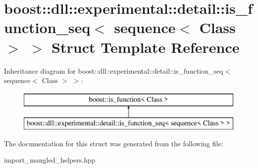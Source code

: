 \hypertarget{a01456}{}\section{boost\+:\+:dll\+:\+:experimental\+:\+:detail\+:\+:is\+\_\+function\+\_\+seq$<$ sequence$<$ Class $>$ $>$ Struct Template Reference}
\label{a01456}
Inheritance diagram for boost\+:\+:dll\+:\+:experimental\+:\+:detail\+:\+:is\+\_\+function\+\_\+seq$<$ sequence$<$ Class $>$ $>$\+:\begin{figure}[H]
\begin{center}
\leavevmode
\includegraphics[height=2.000000cm]{a01456}
\end{center}
\end{figure}


The documentation for this struct was generated from the following file\+:\begin{DoxyCompactItemize}
\item 
import\+\_\+mangled\+\_\+helpers.\+hpp\end{DoxyCompactItemize}
